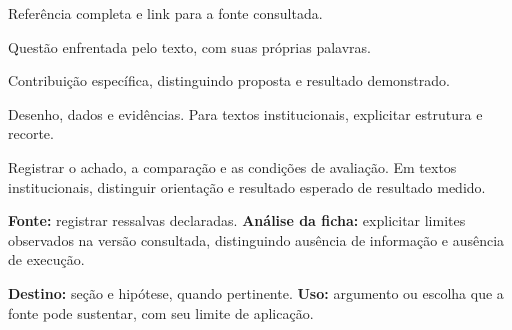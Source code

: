 {\small Referência completa e link para a fonte consultada.\par}

Questão enfrentada pelo texto, com suas próprias palavras.

Contribuição específica, distinguindo proposta e resultado demonstrado.

Desenho, dados e evidências. Para textos institucionais, explicitar estrutura e recorte.

Registrar o achado, a comparação e as condições de avaliação. Em textos institucionais, distinguir orientação e resultado esperado de resultado medido.

\begin{itemize}
\end{itemize}

\textbf{Fonte:} registrar ressalvas declaradas.
\textbf{Análise da ficha:} explicitar limites observados na versão consultada, distinguindo ausência de informação e ausência de execução.

\textbf{Destino:} seção e hipótese, quando pertinente.
\textbf{Uso:} argumento ou escolha que a fonte pode sustentar, com seu limite de aplicação.


